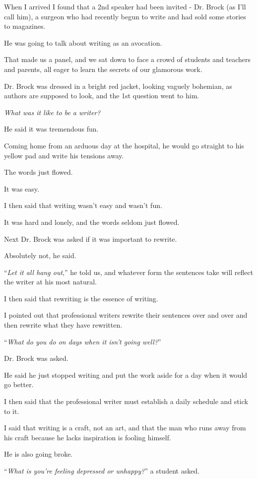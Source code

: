 \documentclass{book}
\numberwithin{equation}{section}
\begin{document}
When I arrived I found that a 2nd speaker had been invited - Dr. Brock (as I'll call him), a surgeon who had recently begun to write and had sold some stories to magazines.

He was going to talk about writing as an avocation.

That made us a panel, and we sat down to face a crowd of students and teachers and parents, all eager to learn the secrets of our glamorous work.

%
Dr. Brock was dressed in a bright red jacket, looking vaguely bohemian, as authors are supposed to look, and the 1st question went to him.

\textit{What was it like to be a writer?}

%
He said it was tremendous fun.

Coming home from an arduous day at the hospital, he would go straight to his yellow pad and write his tensions away.

The words just flowed.

It was easy.

I then said that writing wasn't easy and wasn't fun.

It was hard and lonely, and the words seldom just flowed.

%
Next Dr. Brock was asked if it was important to rewrite.

Absolutely not, he said.

``\textit{Let it all hang out},'' he told us, and whatever form the sentences take will reflect the writer at his most natural.

I then said that rewriting is the essence of writing.

I pointed out that professional writers rewrite their sentences over and over and then rewrite what they have rewritten.

%
``\textit{What do you do on days when it isn't going well?}''

Dr. Brock was asked.

He said he just stopped writing and put the work aside for a day when it would go better.

I then said that the professional writer must establish a daily schedule and stick to it.

I said that writing is a craft, not an art, and that the man who runs away from his craft because he lacks inspiration is fooling himself.

He is also going broke.

%
``\textit{What is you're feeling depressed or unhappy?}'' a student asked.
\end{document}
